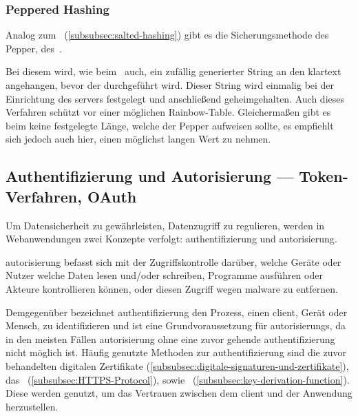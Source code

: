 \subsubsection{Peppered Hashing}\label{subsubsec:peppered-hashing}

Analog zum\  (\autoref{subsubsec:salted-hashing}) gibt es die Sicherungsmethode des Pepper, \bzw des\ .

Bei diesem wird, wie beim\  auch, ein zufällig generierter String an den \gls{klartext} angehangen, bevor der  durchgeführt wird.
Dieser String wird einmalig bei der Einrichtung des \glspl{server} festgelegt und anschließend geheimgehalten\autocite[\vglf][]{Securing39:online}.
Auch dieses Verfahren schützt vor einer möglichen \gls{Rainbow-Table}.
Gleichermaßen gibt es beim  keine festgelegte Länge, welche der Pepper aufweisen sollte, es empfiehlt sich jedoch auch hier, einen möglichst langen Wert zu nehmen.


\subsection[Authentifizierung und Autorisierung]{Authentifizierung und Autorisierung — Token-Verfahren, OAuth}\label{subsec:authenticationAuthorization}
Um Datensicherheit zu gewährleisten, \bzw Datenzugriff zu regulieren, werden in Webanwendungen zwei Konzepte verfolgt: \gls{authentifizierung} und \gls{autorisierung}.

\gls{autorisierung} befasst sich mit der Zugriffskontrolle darüber, welche Geräte oder Nutzer welche Daten lesen und/oder schreiben, Programme ausführen oder Akteure kontrollieren können\autocite[\vglf][]{Auth:2017}, oder diesen Zugriff \zb wegen \gls{malware} zu entfernen.\autocite[\vglf][]{Auth:2017}

Demgegenüber bezeichnet \gls{authentifizierung} den Prozess, einen \gls{client}, Gerät oder Mensch, zu identifizieren und ist eine Grundvoraussetzung für \glspl{autorisierung}, da in den meisten Fällen \gls{autorisierung} ohne eine zuvor gehende \gls{authentifizierung} nicht möglich ist.\autocite[\vglf][]{Auth:2017}
Häufig genutzte Methoden zur \gls{authentifizierung} sind die zuvor behandelten digitalen Zertifikate (\autoref{subsubsec:digitale-signaturen-und-zertifikate}), das\  (\autoref{subsubsec:HTTPS-Protocol}), sowie\  (\autoref{subsubsec:key-derivation-function}).
Diese werden genutzt, um das Vertrauen zwischen dem \gls{client} und der Anwendung herzustellen.\autocite[\vglf][]{Auth:2017}

